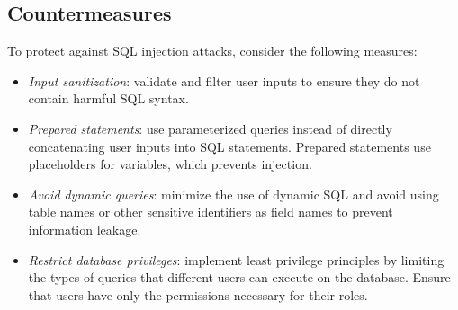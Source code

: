 \subsection{Countermeasures}
To protect against SQL injection attacks, consider the following measures:
\begin{itemize}
    \item \textit{Input sanitization}: validate and filter user inputs to ensure they do not contain harmful SQL syntax.
    \item \textit{Prepared statements}: use parameterized queries instead of directly concatenating user inputs into SQL statements. 
        Prepared statements use placeholders for variables, which prevents injection.
    \item \textit{Avoid dynamic queries}: minimize the use of dynamic SQL and avoid using table names or other sensitive identifiers as field names to prevent information leakage.
    \item \textit{Restrict database privileges}: implement least privilege principles by limiting the types of queries that different users can execute on the database. 
        Ensure that users have only the permissions necessary for their roles.
\end{itemize}